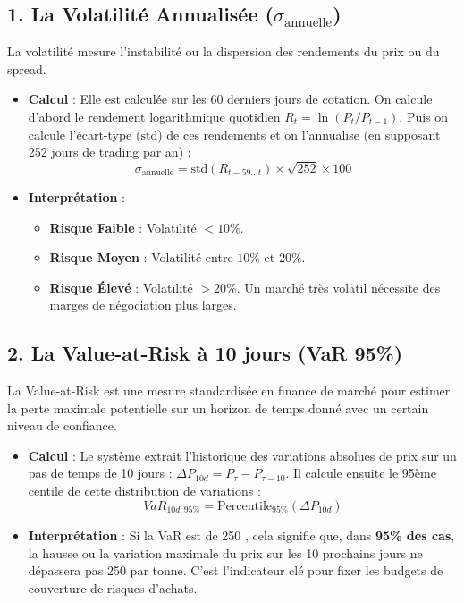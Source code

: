 \documentclass[12pt,a4paper]{article}
\begin{document}
\subsection{1. La Volatilité Annualisée ($\sigma_{\text{annuelle}}$)}
La volatilité mesure l'instabilité ou la dispersion des rendements du prix ou du spread.
\begin{itemize}
    \item \textbf{Calcul} : Elle est calculée sur les 60 derniers jours de cotation. On calcule d'abord le rendement logarithmique quotidien $R_t = \ln(P_t / P_{t-1})$. Puis on calcule l'écart-type ($\text{std}$) de ces rendements et on l'annualise (en supposant 252 jours de trading par an) :
    \begin{equation}
    \sigma_{\text{annuelle}} = \text{std}(R_{t-59 \dots t}) \times \sqrt{252} \times 100
    \end{equation}
    \item \textbf{Interprétation} :
    \begin{itemize}
        \item \textbf{Risque Faible} : Volatilité $< 10\%$.
        \item \textbf{Risque Moyen} : Volatilité entre $10\%$ et $20\%$.
        \item \textbf{Risque Élevé} : Volatilité $> 20\%$. Un marché très volatil nécessite des marges de négociation plus larges.
    \end{itemize}
\end{itemize}

\subsection{2. La Value-at-Risk à 10 jours (VaR 95\%)}
La Value-at-Risk est une mesure standardisée en finance de marché pour estimer la perte maximale potentielle sur un horizon de temps donné avec un certain niveau de confiance.
\begin{itemize}
    \item \textbf{Calcul} : Le système extrait l'historique des variations absolues de prix sur un pas de temps de 10 jours : $\Delta P_{10d} = P_{\tau} - P_{\tau-10}$. Il calcule ensuite le 95ème centile de cette distribution de variations :
    \begin{equation}
    VaR_{10d, 95\%} = \text{Percentile}_{95\%}(\Delta P_{10d})
    \end{equation}
    \item \textbf{Interprétation} : Si la VaR est de 250 \yen, cela signifie que, dans \textbf{95\% des cas}, la hausse ou la variation maximale du prix sur les 10 prochains jours ne dépassera pas 250 \yen{} par tonne. C'est l'indicateur clé pour fixer les budgets de couverture de risques d'achats.
\end{itemize}
\end{document}

